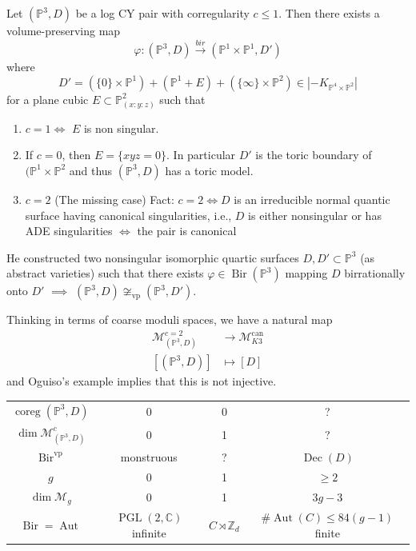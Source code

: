 \begin{thm}[Ducat, 2023]\leavevmode
	Let $(\mathbb{P}^3,D)$ be a log CY pair with corregularity $c\leq 1$. Then there exists a volume-preserving map
	\[\varphi:(\mathbb{P}^3,D)\overset{bir}{\longrightarrow}(\mathbb{P}^1\times \mathbb{P}^1,D') \]
	where
	\[D'=(\{0\} \times \mathbb{P}^1)+(\mathbb{P}^1+E)+(\{\infty\} \times \mathbb{P}^2)\in |-K_{\mathbb{P}^4\times \mathbb{P}^2}|\]
	for a plane cubic $E\subset \mathbb{P}^2_{(x:y:z)}$ such that
	\begin{enumerate}
		\item  $c=1\iff$ $E$ is non singular.

		\item If $c=0$, then $E=\{xyz=0\}$. In particular $D'$ is the toric boundary of $(\mathbb{P}^1\times \mathbb{P}^2$ and thus $(\mathbb{P}^3,D)$ has a toric model.

		\item $c=2$ (The missing case) Fact:  $c=2\iff D$ is an irreducible normal quantic surface having canonical singularities, i.e., $D$ is either nonsingular or has ADE singularities $ \iff$ the pair is canonical
	\end{enumerate}
\end{thm}

\begin{example}
	He constructed two nonsingular isomorphic quartic surfaces $D,D'\subset \mathbb{P}^3$ (as abstract varieties) such that there exists $\varphi \in\operatorname{Bir}(\mathbb{P}^3)$ mapping $D$ birrationally onto $D'$ $\implies $ $(\mathbb{P}^3,D)\not\cong_{\operatorname{vp}} (\mathbb{P}^3,D')$.
\end{example}

	Thinking in terms of coarse moduli spaces, we have a natural map
	\begin{align*}
		\mathcal{M}_{(\mathbb{P}^3,D)}^{c=2}  &\longrightarrow  \mathcal{M}_{K3}^{\operatorname{can}}\\
		[(\mathbb{P}^3,D)] &\longmapsto [D]
	\end{align*}
	and Oguiso's example implies that this is not injective.

\begin{conjecture}[Trichotomy]
\leavevmode 

\begin{table}[H]
	\centering
	\begin{tabular}{c|ccc}
		$\operatorname{coreg}(\mathbb{P}^3,D)$&0&0&?\\
		$\dim \mathcal{M}_{(\mathbb{P}^3,D)}^c$ &0&1&?\\
		$\operatorname{Bir}^{\operatorname{vp}}$ &monstruous&?&$\operatorname{Dec}(D)$ \\
		\hline
		$g$&0&1&$\geq 2$\\
		$\dim \mathcal{M}_{g}$ &0&1&$3g-3$\\
	$\operatorname{Bir}=\operatorname{Aut}$ &$\operatorname{PGL}(2,\mathbb{C})$ infinite&$C\rtimes\mathbb{Z}_d$&\#$\operatorname{Aut}(C)\leq 84(g-1)$ finite
	\end{tabular}
\end{table}
\end{conjecture}

